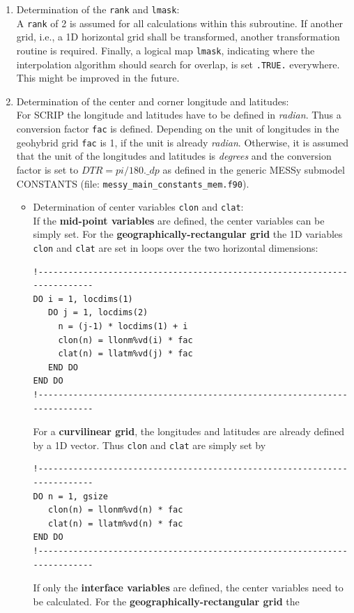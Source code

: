 \documentclass[11pt,twoside]{article}
\begin{document}
\begin{enumerate}
\item Determination of the \verb|rank| and \verb|lmask|: \\
A \verb|rank| of 2 is assumed for all calculations within this
subroutine. If another grid, i.e., a 1D horizontal grid shall be
transformed, another transformation routine is required. 
Finally, a logical map \verb|lmask|,
 indicating where the interpolation algorithm
should search for overlap, is set \verb|.TRUE.| everywhere.
 This might be improved in the future.
\item Determination of the center and corner longitude and latitudes:\\
For SCRIP the longitude and latitudes have to be defined in {\it
radian}. Thus a conversion factor \verb|fac| is defined. Depending on
the unit of longitudes in the geohybrid grid \verb|fac| is 1, if the unit is
already {\it radian}. Otherwise, it is assumed that the  unit 
of the longitudes and latitudes is {\it degrees} and the
conversion factor is set to $DTR = pi/180.\_dp$ as defined in the
generic MESSy submodel CONSTANTS
(file: \verb|messy_main_constants_mem.f90|).
\begin{itemize}
\item Determination of center variables \verb|clon| and \verb|clat|:\\
If the {\bf mid-point variables} are defined, the center variables can be
simply set. For the {\bf geographically-rectangular grid}  the
1D variables \verb|clon| and \verb|clat| are set in loops
over the two horizontal dimensions:
\begin{verbatim}
!--------------------------------------------------------------------------
DO i = 1, locdims(1)
   DO j = 1, locdims(2)
     n = (j-1) * locdims(1) + i
     clon(n) = llonm%vd(i) * fac 
     clat(n) = llatm%vd(j) * fac
   END DO
END DO
!--------------------------------------------------------------------------
\end{verbatim}
For a {\bf curvilinear grid}, the longitudes and latitudes are already
defined by a 1D vector. Thus  \verb|clon|
and \verb|clat| are simply set by
\begin{verbatim}
!--------------------------------------------------------------------------
DO n = 1, gsize
   clon(n) = llonm%vd(n) * fac 
   clat(n) = llatm%vd(n) * fac
END DO
!--------------------------------------------------------------------------
\end{verbatim}
If only the {\bf interface variables} are defined, the center variables
need to be calculated. For the {\bf geographically-rectangular grid} the

\end{itemize}
\end{enumerate}
\end{document}
